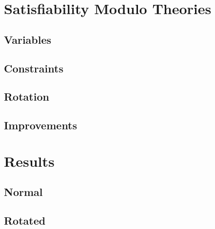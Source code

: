 \documentclass[a4paper, 12pt]{article}
\begin{document}
\clearpage

\section{Satisfiability Modulo Theories}

\subsection{Variables}
\subsection{Constraints}
\subsection{Rotation}
\subsection{Improvements}

\clearpage

\section{Results}

\subsection{Normal}
\subsection{Rotated}
\end{document}
